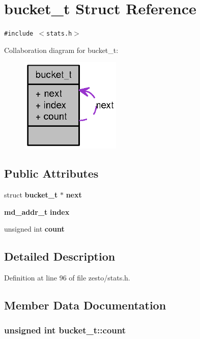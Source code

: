 \section{bucket\_\-t Struct Reference}
\label{structbucket__t}
{\tt \#include $<$stats.h$>$}

Collaboration diagram for bucket\_\-t:\nopagebreak
\begin{figure}[H]
\begin{center}
\leavevmode
\includegraphics[width=135pt]{structbucket__t__coll__graph}
\end{center}
\end{figure}
\subsection*{Public Attributes}
\begin{CompactItemize}
\item 
struct {\bf bucket\_\-t} $\ast$ {\bf next}
\item 
{\bf md\_\-addr\_\-t} {\bf index}
\item 
unsigned int {\bf count}
\end{CompactItemize}


\subsection{Detailed Description}


Definition at line 96 of file zesto/stats.h.

\subsection{Member Data Documentation}
\subsubsection[{count}]{\setlength{\rightskip}{0pt plus 5cm}unsigned int {\bf bucket\_\-t::count}}\label{structbucket__t_2b62c392a3f40f5ac7d0915ea844130b}




